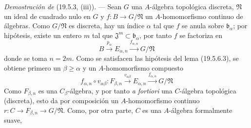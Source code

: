 \begin{env}[19.5.6.8]
\label{0.19.5.6.8-fr}
\emph{Demostración de} (19.5.3, (iii)). --- Sean $G$ una $A$-álgebra
topológica discreta, $\mathfrak N$ un ideal de cuadrado nulo en $G$ y
$f:B\to G/\mathfrak N$ un $A$-homomorfismo continuo de álgebras. Como
$G/\mathfrak N$ es discreta, hay un índice $\alpha$ tal que $f$ se anula
sobre $\mathfrak b_\alpha$; por hipótesis, existe un entero $m$ tal que
$\mathfrak J^m\subset\mathfrak b_\alpha$, por tanto $f$ se factoriza en
\[
  B\xrightarrow{p_\alpha}E_{\alpha,n}
  \xrightarrow{f_{\alpha,n}}G/\mathfrak N
\]
donde se toma $n=2m$. Como se satisfacen las hipótesis del lema (19.5.6.3), se
obtiene primero un $\beta\geq\alpha$ y un $A$-homomorfismo compuesto
\begin{equation}
\label{0.19.5.6.9-fr}
  f_{\alpha,n}\circ v_{\alpha\beta}:F_{\beta,n}
  \xrightarrow{v_{\alpha\beta}}E_{\alpha,n}
  \xrightarrow{f_{\alpha,n}}G/\mathfrak N
  \tag{19.5.6.9}
\end{equation}
Como $F_{\beta,n}$ es una $C_\beta$-álgebra, y por tanto \emph{a fortiori} una
$C$-álgebra topológica (discreta), esto da por composición un
$A$-homomorfismo continuo
$r:C\to F_{\beta,n}\to G/\mathfrak N$. Como, por otra parte, $C$ es una
$A$-álgebra formalmente suave,



\end{env}
